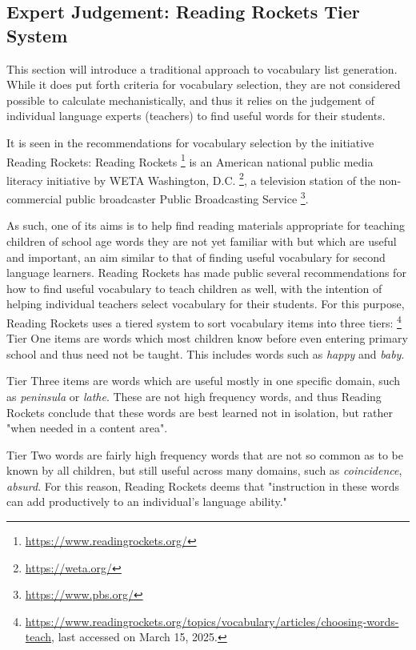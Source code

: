 \subsection{Expert Judgement: Reading Rockets Tier System}
This section will introduce a traditional approach to vocabulary list generation.
While it does put forth criteria for vocabulary selection, they are not considered possible to calculate mechanistically, and thus it relies on the judgement of individual language experts (teachers) to find useful words for their students.

It is seen in the recommendations for vocabulary selection by the initiative Reading Rockets:
Reading Rockets \footnote{\url{https://www.readingrockets.org/}} is an American national public media literacy initiative by WETA Washington, D.C. \footnote{\url{https://weta.org/}}, a television station of the non-commercial public broadcaster Public Broadcasting Service \footnote{\url{https://www.pbs.org/}}.

As such, one of its aims is to help find reading materials appropriate for teaching children of school age words they are not yet familiar with but which are useful and important, an aim similar to that of finding useful vocabulary for second language learners.
Reading Rockets has made public several recommendations for how to find useful vocabulary to teach children as well, with the intention of helping individual teachers select vocabulary for their students.
For this purpose, Reading Rockets uses a tiered system to sort vocabulary items into three tiers:
\footnote{\label{footnote:reading-rockets-choosing-words-to-teach} \url{https://www.readingrockets.org/topics/vocabulary/articles/choosing-words-teach}, last accessed on March 15, 2025.}
Tier One items are words which most children know before even entering primary school and thus need not be taught.
This includes words such as \textit{happy} and \textit{baby}.

Tier Three items are words which are useful mostly in one specific domain, such as \textit{peninsula} or \textit{lathe}.
These are not high frequency words, and thus Reading Rockets conclude that these words are best learned not in isolation, but rather "when needed in a content area".

Tier Two words are fairly high frequency words that are not so common as to be known by all children, but still useful across many domains, such as \textit{coincidence}, \textit{absurd}.
For this reason, Reading Rockets deems that "instruction in these words can add productively to an individual’s language ability." 

